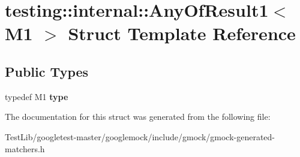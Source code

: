 \hypertarget{structtesting_1_1internal_1_1AnyOfResult1}{}\section{testing\+:\+:internal\+:\+:Any\+Of\+Result1$<$ M1 $>$ Struct Template Reference}
\label{structtesting_1_1internal_1_1AnyOfResult1}
\subsection*{Public Types}
\begin{DoxyCompactItemize}
\item 
\mbox{\label{structtesting_1_1internal_1_1AnyOfResult1_a4c55b5cf196c93e2a822bc99625f6797}} 
typedef M1 {\bfseries type}
\end{DoxyCompactItemize}


The documentation for this struct was generated from the following file\+:\begin{DoxyCompactItemize}
\item 
Test\+Lib/googletest-\/master/googlemock/include/gmock/gmock-\/generated-\/matchers.\+h\end{DoxyCompactItemize}
